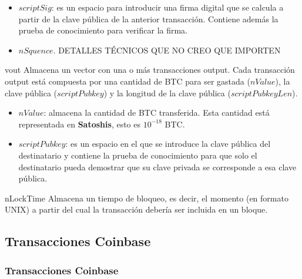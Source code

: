 \documentclass{beamer}
\theoremstyle{definition}
\begin{document}
\begin{frame}
	\begin{itemize}
		\item<1-> $scriptSig$: es un espacio para introducir una firma digital que se calcula a partir de la clave pública de la anterior transacción. Contiene además la prueba de conocimiento para verificar la firma. %
		\item<2-> $nSquence$. DETALLES TÉCNICOS QUE NO CREO QUE IMPORTEN
		\end{itemize}
\end{frame}

\begin{frame}
	\begin{block}{vout}
		Almacena un vector con una o más transacciones output. Cada transacción output está compuesta por una cantidad de BTC para ser gastada ($nValue$), la clave pública ($scriptPubkey$) y la longitud de la clave pública ($scriptPubkeyLen$).
	\end{block}
\begin{itemize}
	\item<2-> $nValue$: almacena la cantidad de BTC transferida. Esta cantidad está representada en \textbf{Satoshis}, esto es $10^{-18}$ BTC.
	\item<3->$scriptPubkey$: es un espacio en el que se introduce la clave pública del destinatario y contiene la prueba de conocimiento para que solo el destinatario pueda demostrar que su clave privada se corresponde a esa clave pública.
\end{itemize}
	
\end{frame}

\begin{frame}

	\begin{block}{nLockTime}
		Almacena un tiempo de bloqueo, es decir, el momento (en formato UNIX) a partir del cual la transacción debería ser incluida en un bloque.
	\end{block}
\end{frame}

\subsection{Transacciones Coinbase}
\begin{frame}
	\frametitle{Transacciones Coinbase}
\end{frame}
\end{document}
